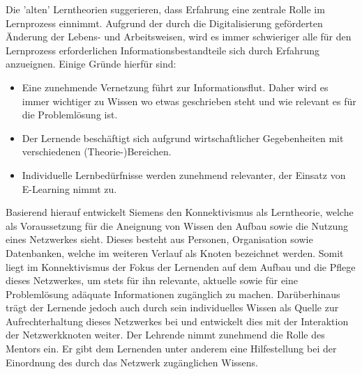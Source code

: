 Die 'alten' Lerntheorien suggerieren, dass Erfahrung eine zentrale Rolle im Lernprozess einnimmt. Aufgrund der durch die Digitalisierung geförderten Änderung der Lebens- und Arbeitsweisen, wird es immer schwieriger alle für den Lernprozess erforderlichen Informationsbestandteile sich durch Erfahrung anzueignen.\cite[S. 159ff.]{Erpenbeck.2007} Einige Gründe hierfür sind:
\begin{itemize}
	\item Eine zunehmende Vernetzung führt zur Informationsflut. Daher wird es immer wichtiger zu Wissen wo etwas geschrieben steht und wie relevant es für die Problemlösung ist.
	\item Der Lernende beschäftigt sich aufgrund wirtschaftlicher Gegebenheiten mit verschiedenen (Theorie-)Bereichen.
	\item Individuelle Lernbedürfnisse werden zunehmend relevanter, der Einsatz von E-Learning nimmt zu.
\end{itemize}
Basierend hierauf entwickelt Siemens den Konnektivismus als Lerntheorie, welche als Voraussetzung für die Aneignung von Wissen den Aufbau sowie die Nutzung eines Netzwerkes sieht. Dieses besteht aus Personen, Organisation sowie Datenbanken, welche im weiteren Verlauf als Knoten bezeichnet werden. Somit liegt im Konnektivismus der Fokus der Lernenden auf dem Aufbau und die Pflege dieses Netzwerkes, um stets für ihn relevante, aktuelle sowie für eine Problemlösung adäquate Informationen zugänglich zu machen. Darüberhinaus trägt der Lernende jedoch auch durch sein individuelles Wissen als Quelle zur Aufrechterhaltung dieses Netzwerkes bei und entwickelt dies mit der Interaktion der Netzwerkknoten weiter. Der Lehrende nimmt zunehmend die Rolle des Mentors ein. Er gibt dem Lernenden unter anderem eine Hilfestellung bei der Einordnung des durch das Netzwerk zugänglichen Wissens.\cite[S. 48f.]{Kuhlmann.2008} 

